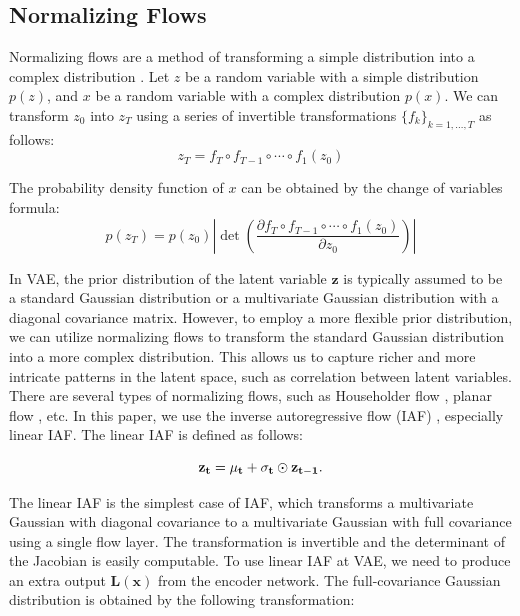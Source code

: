 \documentclass[10pt]{article}
\begin{document}
\subsection{Normalizing Flows}

Normalizing flows are a method of transforming a simple distribution into a complex distribution \cite{rezende15normalizingflows}. Let $z$ be a random variable with a simple distribution $p(z)$, and $x$ be a random variable with a complex distribution $p(x)$. We can transform $z_0$ into $z_T$ using a series of invertible transformations $\{f_k\}_{k=1,\ldots,T}$ as follows:
\begin{equation}
    z_T = f_T \circ f_{T-1} \circ \cdots \circ f_1(z_0)
\end{equation}

The probability density function of $x$ can be obtained by the change of variables formula:
\begin{equation}
    p(z_T) = p(z_0) \left| \det \left( \frac{\partial f_T \circ f_{T-1} \circ \cdots \circ f_1(z_0)}{\partial z_0} \right) \right|
\end{equation}

In VAE, the prior distribution of the latent variable $\mathbf{z}$ is typically assumed to be a standard Gaussian distribution or a multivariate Gaussian distribution with a diagonal covariance matrix. \cite{kingma2013auto} However, to employ a more flexible prior distribution, we can utilize normalizing flows to transform the standard Gaussian distribution into a more complex distribution. This allows us to capture richer and more intricate patterns in the latent space, such as correlation between latent variables.\\

There are several types of normalizing flows, such as Householder flow \cite{tomczak2017householder}, planar flow \cite{rezende15normalizingflows}, etc. In this paper, we use the inverse autoregressive flow (IAF) \cite{kingma2016iaf}, especially linear IAF. The linear IAF is defined as follows:

\begin{equation}
    \bf z_t = \bf \mu_t + \bf \sigma_t \odot \bf z_{t-1}.
\end{equation}

The linear IAF is the simplest case of IAF, which transforms a multivariate Gaussian with diagonal covariance to a multivariate Gaussian with full covariance using a single flow layer. The transformation is invertible and the determinant of the Jacobian is easily computable. To use linear IAF at VAE, we need to produce an extra output $\mathbf{L(x)}$ from the encoder network. The full-covariance Gaussian distribution is obtained by the following transformation:
\end{document}
